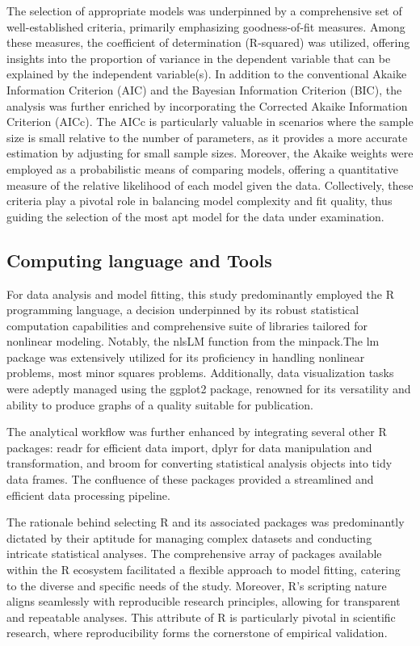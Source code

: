 \documentclass[11pt]{article}
\begin{document}
\hfill\break
The selection of appropriate models was underpinned by a comprehensive set of well-established criteria, primarily emphasizing goodness-of-fit measures. Among these measures, the coefficient of determination (R-squared) was utilized, offering insights into the proportion of variance in the dependent variable that can be explained by the independent variable(s). In addition to the conventional Akaike Information Criterion (AIC) and the Bayesian Information Criterion (BIC), the analysis was further enriched by incorporating the Corrected Akaike Information Criterion (AICc). The AICc is particularly valuable in scenarios where the sample size is small relative to the number of parameters, as it provides a more accurate estimation by adjusting for small sample sizes\cite{Johnson2004}. Moreover, the Akaike weights were employed as a probabilistic means of comparing models, offering a quantitative measure of the relative likelihood of each model given the data\cite{Wagenmakers2004}. Collectively, these criteria play a pivotal role in balancing model complexity and fit quality, thus guiding the selection of the most apt model for the data under examination.

\subsection{Computing language and Tools}
For data analysis and model fitting, this study predominantly employed the R programming language, a decision underpinned by its robust statistical computation capabilities and comprehensive suite of libraries tailored for nonlinear modeling. Notably, the nlsLM function from the minpack.The lm package was extensively utilized for its proficiency in handling nonlinear problems, most minor squares problems. Additionally, data visualization tasks were adeptly managed using the ggplot2 package, renowned for its versatility and ability to produce graphs of a quality suitable for publication.

\hfill\break
The analytical workflow was further enhanced by integrating several other R packages: readr for efficient data import, dplyr for data manipulation and transformation, and broom for converting statistical analysis objects into tidy data frames. The confluence of these packages provided a streamlined and efficient data processing pipeline.

\hfill\break
The rationale behind selecting R and its associated packages was predominantly dictated by their aptitude for managing complex datasets and conducting intricate statistical analyses. The comprehensive array of packages available within the R ecosystem facilitated a flexible approach to model fitting, catering to the diverse and specific needs of the study. Moreover, R's scripting nature aligns seamlessly with reproducible research principles, allowing for transparent and repeatable analyses. This attribute of R is particularly pivotal in scientific research, where reproducibility forms the cornerstone of empirical validation.
\end{document}
